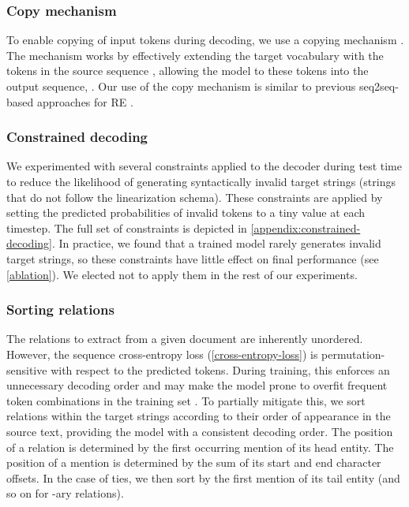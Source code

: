 \documentclass[11pt]{article}
\begin{document}
\subsubsection{Copy mechanism} \label{copy-mechanism}

To enable copying of input tokens during decoding, we use a copying mechanism \citep{gu2016incorporating}. The mechanism works by effectively extending the target vocabulary with the tokens in the source sequence , allowing the model to  these tokens into the output sequence, . Our use of the copy mechanism is similar to previous seq2seq-based approaches for RE \citep{zeng-etal-2018-extracting, Zeng2020CopyMTLCM}.


\subsubsection{Constrained decoding} \label{constrained-decoding}


We experimented with several constraints applied to the decoder during test time to reduce the likelihood of generating syntactically invalid target strings (strings that do not follow the linearization schema). These constraints are applied by setting the predicted probabilities of invalid tokens to a tiny value at each timestep. The full set of constraints is depicted in \autoref{appendix:constrained-decoding}. In practice, we found that a trained model rarely generates invalid target strings, so these constraints have little effect on final performance (see \textsection\ref{ablation}). We elected not to apply them in the rest of our experiments.

\subsubsection{Sorting relations} \label{sorting-relations}

The relations to extract from a given document are inherently unordered. However, the sequence cross-entropy loss (\autoref{cross-entropy-loss}) is permutation-sensitive with respect to the predicted tokens. During training, this enforces an unnecessary decoding order and may make the model prone to overfit frequent token combinations in the training set \citep{Vinyals2016OrderMS, yang2019deep}. To partially mitigate this, we sort relations within the target strings according to their order of appearance in the source text, providing the model with a consistent decoding order. The position of a relation is determined by the first occurring mention of its head entity. The position of a mention is determined by the sum of its start and end character offsets. In the case of ties, we then sort by the first mention of its tail entity (and so on for -ary relations).
\end{document}
